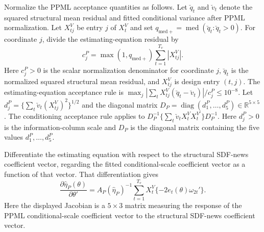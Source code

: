 \documentclass[11pt]{article}
\begin{document}
Normalize the PPML acceptance quantities as follows. Let \(\breve q_t\) and \(\breve v_t\) denote the squared
structural mean residual and fitted conditional variance after PPML normalization. Let
\(X_{tj}^V\) be entry \(j\) of \(X_t^V\) and set
\(q_{\mathrm{med}+}=\operatorname{med}(\breve q_t:\breve q_t>0)\). For coordinate \(j\), divide the estimating-equation residual by
\begin{equation*}
 c^P_j=\max(1,q_{\mathrm{med}+})\sum_{t=1}^{T_v}|X_{tj}^V|.
\end{equation*}
Here \(c_j^P>0\) is the scalar normalization denominator for coordinate \(j\),
\(\breve q_t\) is the normalized squared structural mean residual, and \(X_{tj}^V\) is design entry
\((t,j)\). The estimating-equation acceptance rule is
\(\max_j|\sum_tX_{tj}^V(\breve q_t-\breve v_t)|/c^P_j\le10^{-8}\). Let
\(d^P_j=\{\sum_t\breve v_t(X_{tj}^V)^2\}^{1/2}\) and the diagonal matrix
\(D_P=\operatorname{diag}(d^P_1,\ldots,d^P_5)\in\mathbb R^{5\times5}\). The conditioning acceptance rule applies to
\(D_P^{-1}\{\sum_t\breve v_tX_t^VX_t^{V\prime}\}D_P^{-1}\).
Here \(d_j^P>0\) is the information-column scale and \(D_P\) is the diagonal matrix containing the
five values \(d_1^P,\ldots,d_5^P\).

Differentiate the estimating equation with respect to the structural SDF-news coefficient vector,
regarding the fitted conditional-scale coefficient vector as a function of that vector. That differentiation gives
\begin{equation*}
 \frac{\partial\widehat\eta_P(\theta)}{\partial\theta'}
 =A_P(\widehat\eta_P)^{-1}
   \sum_{t=1}^{T_v}X_t^V\{-2e_t(\theta)\omega_{2t}'\}.
\end{equation*}
Here the displayed Jacobian is a \(5\times3\) matrix measuring the response of the PPML
conditional-scale coefficient vector to the structural SDF-news coefficient vector.
\end{document}
